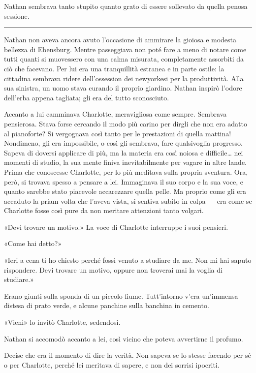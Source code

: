 \documentclass[a4paper,oneside,11pt]{memoir}
\begin{document}
Nathan sembrava tanto stupito quanto grato di essere sollevato da quella penosa
sessione.

\plainbreak{1}

Nathan non aveva ancora avuto l'occasione di ammirare la gioiosa e modesta
bellezza di Ebensburg. Mentre passeggiava non poté fare a meno di notare come
tutti quanti si muovessero con una calma misurata, completamente assorbiti da
ciò che facevano. Per lui era una tranquillità estranea e in parte ostile: la
cittadina sembrava ridere dell'ossession dei newyorkesi per la produttività.
Alla sua sinistra, un uomo stava curando il proprio giardino. Nathan inspirò
l'odore dell'erba appena tagliata; gli era del tutto sconosciuto.

Accanto a lui camminava Charlotte, meravigliosa come sempre. Sembrava
pensierosa. Stava forse cercando il modo più carino per dirgli che non era
adatto al pianoforte? Si vergognava così tanto per le prestazioni di quella
mattina! Nondimeno, gli era impossibile, o così gli sembrava, fare qualsivoglia
progresso. Sapeva di doversi applicare di più, ma la materia era così noiosa e
difficile\dots{} nei momenti di studio, la sua mente finiva inevitabilmente per
vagare in altre lande. Prima che conoscesse Charlotte, per lo più meditava sulla
propria sventura. Ora, però, si trovava spesso a pensare a lei. Immaginava il
suo corpo e la sua voce, e quanto sarebbe stato piacevole accarezzare quella
pelle. Ma proprio come gli era accaduto la priam volta che l'aveva vista, si
sentiva subito in colpa --- era come se Charlotte fosse così pure da non
meritare attenzioni tanto volgari.

«Devi trovare un motivo.» La voce di Charlotte interruppe i suoi pensieri.

«Come hai detto?»

«Ieri a cena ti ho chiesto perché fossi venuto a studiare da me. Non mi hai
saputo rispondere. Devi trovare un motivo, oppure non troverai mai la voglia di
studiare.»

Erano giunti sulla sponda di un piccolo fiume. Tutt'intorno v'era un'immensa
distesa di prato verde, e alcune panchine sulla banchina in cemento.

«Vieni» lo invitò Charlotte, sedendosi.

Nathan si accomodò accanto a lei, così vicino che poteva avvertirne il profumo.

Decise che era il momento di dire la verità. Non sapeva se lo stesse facendo per
sé o per Charlotte, perché lei meritava di sapere, e non dei sorrisi ipocriti.
\end{document}
